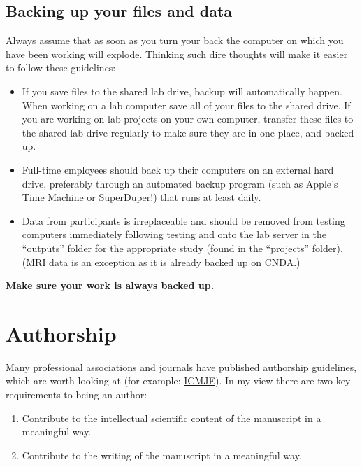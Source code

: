 \documentclass[letterpaper,12pt,oneside]{memoir}
\begin{document}
\subsection{Backing up your files and data}

Always assume that as soon as you turn your back the computer on which you have been working will explode. Thinking such dire thoughts will make it easier to follow these guidelines:

\begin{itemize}
\item If you save files to the shared lab drive, backup will automatically happen. When working on a lab computer save all of your files to the shared drive. If you are working on lab projects on your own computer, transfer these files to the shared lab drive regularly to make sure they are in one place, and backed up.
\item Full-time employees should back up their computers on an external hard drive, preferably through an automated backup program (such as Apple's Time Machine or SuperDuper!) that runs at least daily.
\item Data from participants is irreplaceable and should be removed from testing computers immediately following testing and onto the lab server in the ``outputs'' folder for the appropriate study (found in the ``projects'' folder). (MRI data is an exception as it is already backed up on CNDA.)
\end{itemize}

\noindent \textbf{Make sure your work is always backed up.} 

\section{Authorship}
Many professional associations and journals have published authorship guidelines, which are worth looking at (for example: \href{http://www.icmje.org/recommendations/browse/roles-and-responsibilities/defining-the-role-of-authors-and-contributors.html}{ICMJE}). In my view there are two key requirements to being an author:

\begin{enumerate}
\item Contribute to the intellectual scientific content of the manuscript in a meaningful way.
\item Contribute to the writing of the manuscript in a meaningful way.
\end{enumerate}
\end{document}
